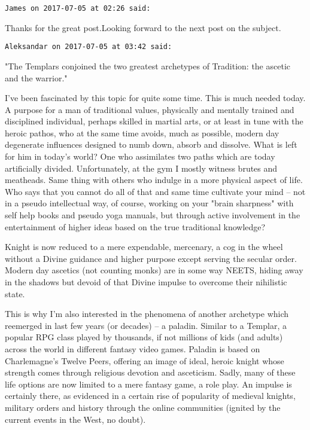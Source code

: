 \begin{footnotesize}\begin{sffamily}



\texttt{James on 2017-07-05 at 02:26 said: }

Thanks for the great post.Looking forward to the next post on the subject.


\hfill

\texttt{Aleksandar on 2017-07-05 at 03:42 said: }

"The Templars conjoined the two greatest archetypes of Tradition: the ascetic and the warrior."

I've been fascinated by this topic for quite some time. This is much needed today. A purpose for a man of traditional values, physically and mentally trained and disciplined individual, perhaps skilled in martial arts, or at least in tune with the heroic pathos, who at the same time avoids, much as possible, modern day degenerate influences designed to numb down, absorb and dissolve. What is left for him in today's world? One who assimilates two paths which are today artificially divided. Unfortunately, at the gym I mostly witness brutes and meatheads. Same thing with others who indulge in a more physical aspect of life. Who says that you cannot do all of that and same time cultivate your mind – not in a pseudo intellectual way, of course, working on your "brain sharpness" with self help books and pseudo yoga manuals, but through active involvement in the entertainment of higher ideas based on the true traditional knowledge?

Knight is now reduced to a mere expendable, mercenary, a cog in the wheel without a Divine guidance and higher purpose except serving the secular order. Modern day ascetics (not counting monks) are in some way NEETS, hiding away in the shadows but devoid of that Divine impulse to overcome their nihilistic state.

This is why I'm also interested in the phenomena of another archetype which reemerged in last few years (or decades) – a paladin. Similar to a Templar, a popular RPG class played by thousands, if not millions of kids (and adults) across the world in different fantasy video games. Paladin is based on Charlemagne's Twelve Peers, offering an image of ideal, heroic knight whose strength comes through religious devotion and asceticism. Sadly, many of these life options are now limited to a mere fantasy game, a role play. An impulse is certainly there, as evidenced in a certain rise of popularity of medieval knights, military orders and history through the online communities (ignited by the current events in the West, no doubt).



\end{sffamily}
\end{footnotesize}
